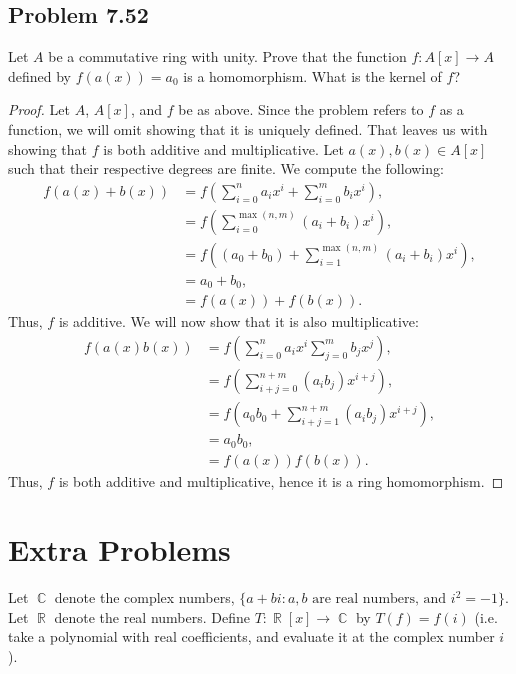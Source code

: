 \documentclass[letterpaper, 12pt]{amsart}
\DeclareMathOperator{\R}{\mathbb{R}}
\DeclareMathOperator{\C}{\mathbb{C}}
\begin{document}
		\subsection*{Problem 7.52}
		\label{sub:problem_7_52}
		Let $A$ be a commutative ring with unity. 
		Prove that the function $f : A[x] \to A$ defined by $f(a(x)) = a_{0}$ is a homomorphism. 
		What is the kernel of $f$?
		\begin{proof}
		Let $A$, $A[x]$, and $f$ be as above.
		Since the problem refers to $f$ as a function, we will omit showing that it is uniquely defined.
		That leaves us with showing that $f$ is both additive and multiplicative.
		Let $a(x), b(x) \in A[x]$ such that their respective degrees are finite.
		We compute the following:
			\begin{align*}
			f(a(x) + b(x)) &= f\left( \sum\limits_{i=0}^{n}a_{i}x^{i} + \sum\limits_{i=0}^{m}b_{i}x^{i} \right), \\
			&= f\left( \sum\limits_{i=0}^{\max{(n,m)}} (a_{i} + b_{i})x^{i} \right), \\
			&= f\left( (a_{0} + b_{0}) + \sum\limits_{i=1}^{\max{(n,m)}} (a_{i} + b_{i})x^{i} \right), \\
			&= a_{0} + b_{0}, \\
			&= f(a(x)) + f(b(x)).
			\end{align*}
		Thus, $f$ is additive.
		We will now show that it is also multiplicative:
			\begin{align*}
			f(a(x)b(x)) &= f\left( \sum\limits_{i=0}^{n}a_{i}x^{i}\sum\limits_{j=0}^{m}b_{j}x^{j} \right), \\
			&= f\left( \sum\limits_{i+j=0}^{n+m} (a_{i}b_{j})x^{i+j} \right), \\
			&= f\left( a_{0}b_{0} + \sum\limits_{i+j=1}^{n+m} (a_{i}b_{j})x^{i+j} \right), \\
			&= a_{0}b_{0}, \\
			&= f(a(x))f(b(x)).
			\end{align*}
		Thus, $f$ is both additive and multiplicative, hence it is a ring homomorphism.
		\end{proof}

	\section{Extra Problems}
	\label{sec:extra_problems}
	Let $\C$ denote the complex numbers, $\{ a + bi : \text{$a, b$ are real numbers, and $i^{2}= -1$} \}$. 
	Let $\R$ denote the real numbers. 
	Define $T: \R[x] \to \C$ by $T(f) = f(i)$ (i.e. take a polynomial with real coefficients, and evaluate it at the complex number $i$).
\end{document}
